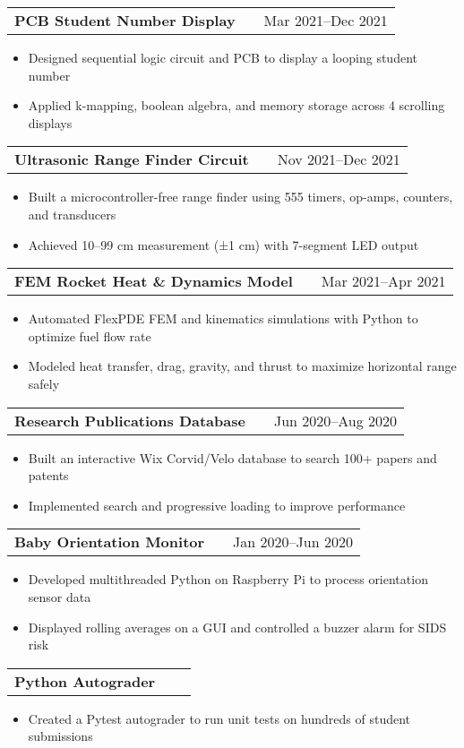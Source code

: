 \documentclass[a4paper,12pt]{article}
\makeatletter
\newenvironment{joblong}[2]
    {
    \begin{tabularx}{\linewidth}{@{}l X r@{}}
    \textbf{#1} & \hfill &  #2 \\[3.75pt]
    \end{tabularx}
    \begin{minipage}[t]{\linewidth}
    \begin{itemize}[nosep,after=\strut, leftmargin=1em, itemsep=3pt,label=--]
    }
    {
    \end{itemize}
    \end{minipage}    
    }
\makeatother
\begin{document}
\begin{joblong}{PCB Student Number Display}{Mar 2021--Dec 2021}
\item Designed sequential logic circuit and PCB to display a looping student number
\item Applied k-mapping, boolean algebra, and memory storage across 4 scrolling displays
\end{joblong}

\begin{joblong}{Ultrasonic Range Finder Circuit}{Nov 2021--Dec 2021}
\item Built a microcontroller-free range finder using 555 timers, op-amps, counters, and transducers
\item Achieved 10–99 cm measurement (±1 cm) with 7-segment LED output
\end{joblong}

\begin{joblong}{FEM Rocket Heat \& Dynamics Model}{Mar 2021--Apr 2021}
\item Automated FlexPDE FEM and kinematics simulations with Python to optimize fuel flow rate
\item Modeled heat transfer, drag, gravity, and thrust to maximize horizontal range safely
\end{joblong}

\begin{joblong}{Research Publications Database}{Jun 2020--Aug 2020}
\item Built an interactive Wix Corvid/Velo database to search 100+ papers and patents
\item Implemented search and progressive loading to improve performance
\end{joblong}

\begin{joblong}{Baby Orientation Monitor}{Jan 2020--Jun 2020}
\item Developed multithreaded Python on Raspberry Pi to process orientation sensor data
\item Displayed rolling averages on a GUI and controlled a buzzer alarm for SIDS risk
\end{joblong}

\begin{joblong}{Python Autograder}{ }
\item Created a Pytest autograder to run unit tests on hundreds of student submissions
\end{joblong}

\end{document}
